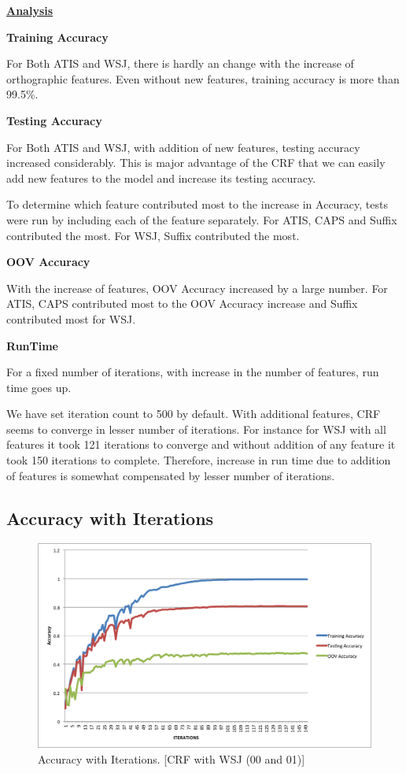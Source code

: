 \underline{\bfseries Analysis}

\textbf{Training Accuracy}

For Both ATIS and WSJ, there is hardly an change with the increase of orthographic features. Even without new features, training accuracy is more than 99.5\%.

\textbf{Testing Accuracy}

For Both ATIS and WSJ, with addition of new features, testing accuracy increased considerably. This is major advantage of the CRF that we can easily add new features to the model and increase its testing accuracy.

To determine which feature contributed most to the increase in Accuracy, tests were run by including each of the feature separately. For ATIS, CAPS and Suffix contributed the most. For WSJ, Suffix contributed the most.

\textbf{OOV Accuracy}

With the increase of features, OOV Accuracy increased by a large number. For ATIS, CAPS contributed most to the OOV Accuracy increase and Suffix contributed most for WSJ. 

\textbf{RunTime}

For a fixed number of iterations, with increase in the number of features, run time goes up. 

We have set iteration count to 500 by default. With additional features, CRF seems to converge in lesser number of iterations. For instance for WSJ with all features it took 121 iterations to converge and without addition of any feature it took 150 iterations to complete. Therefore, increase in run time due to addition of features is somewhat compensated by lesser number of iterations.

\subsection {Accuracy with Iterations}

\begin{figure}[ht!]
\centering
\includegraphics[width=140mm]{accuracy.png}
\caption{Accuracy with Iterations. [CRF with WSJ (00 and 01)]}
\label{accuracy}
\end{figure}

